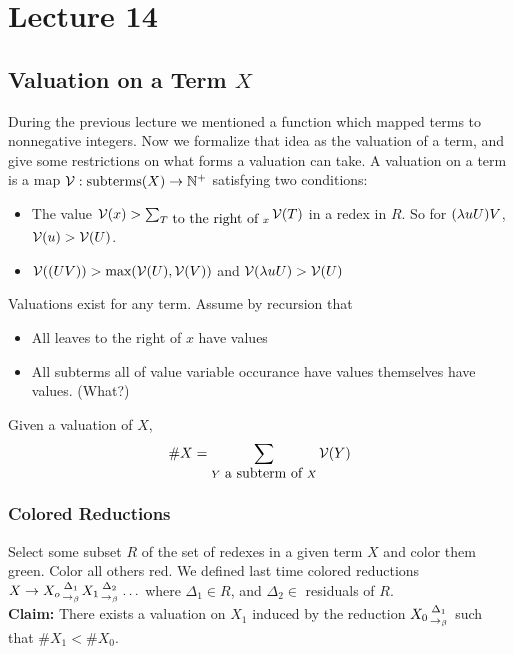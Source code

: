 \chapter{Lecture 14}

\section{Valuation on a Term $X$}
During the previous lecture we mentioned a function which mapped terms to nonnegative integers. Now we formalize that idea as the valuation of a term, and give some restrictions on what forms a valuation can take. A valuation on a term is a map $\mathcal{V} : \hbox{subterms}(X) \rightarrow \mathbb{N}^+$ satisfying two conditions:

\begin{itemize}
\item The value $\mathcal{V}(x) > \sum_{T\hbox{ to the right of }x}\mathcal{V}(T)$ in a redex in $R$. So for $(\lambda uU)V$, $\mathcal{V}(u) > \mathcal{V}(U)$.
\item $\mathcal{V}((UV)) > \hbox{max}(\mathcal{V}(U),\mathcal{V}(V))$ and $\mathcal{V}(\lambda uU) > \mathcal{V}(U)$
\end{itemize}

Valuations exist for any term. Assume by recursion that
\begin{itemize}
  \item All leaves to the right of $x$ have values
  \item All subterms all of value variable occurance have values themselves have values. (What?)
\end{itemize}

Given a valuation of $X$,
\begin{equation*}
  \# X = \sum_{Y\hbox{ a subterm of }X}\mathcal{V}(Y)
\end{equation*}

\subsection{Colored Reductions}
Select some subset $R$ of the set of redexes in a given term $X$ and color them green. Color all others red. We defined last time colored reductions $X \rightarrow X_o {{\Delta_1} \atop {\rightarrow_\beta}} X_1 {{\Delta_2} \atop {\rightarrow_\beta}} \ldots$ where $\Delta_1 \in R$, and $\Delta_2 \in$ residuals of $R$.\\

\textbf{Claim:} There exists a valuation on $X_1$ induced by the reduction $X_0 {{\Delta_1} \atop {\rightarrow_\beta}}$ such that $\# X_1 < \# X_0$.\\

